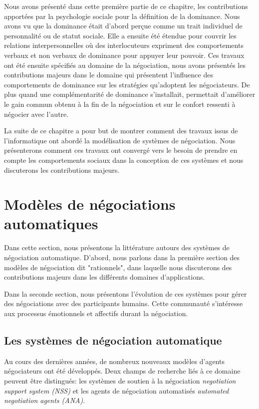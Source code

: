 	
	Nous avons présenté dans cette première partie de ce chapitre, les contributions apportées par la psychologie sociale pour la définition de la dominance. Nous avons vu que la dominance était d'abord perçue comme un trait individuel de personnalité ou de statut sociale. Elle a ensuite été étendue pour couvrir les relations interpersonnelles où des interlocuteurs expriment des comportements verbaux et non verbaux de dominance pour appuyer leur pouvoir. 
	Ces travaux ont été ensuite spécifiés au domaine de la négociation, nous avons présentés les contributions majeurs dans le domaine qui présentent l'influence des comportements de dominance sur les stratégies qu'adoptent les négociateurs. De plus quand une complémentarité de dominance s'installait, permettait d'améliorer le gain commun obtenu à la fin de la négociation et sur le confort ressenti à négocier avec l'autre.
	
	
	La suite de ce chapitre a pour but de montrer comment des travaux issus de l'informatique ont abordé la modélisation de systèmes de négociation. Nous présenterons comment ces travaux ont convergé vers le besoin de prendre en compte les comportements sociaux dans la conception de ces systèmes et nous discuterons les contributions majeurs.  
	
	
	


	\section{Modèles de négociations automatiques}
		Dans cette section, nous présentons la littérature autours des systèmes de négociation automatique. D'abord, nous parlons dans la première section des modèles de négociation dit "rationnels", dans laquelle nous discuterons des contributions majeurs dans les différents domaines d'applications. 
		
		Dans la seconde section, nous présentons l'évolution de ces systèmes pour gérer des négociations avec des participants humains. Cette communauté s'intéresse aux processus émotionnels et affectifs durant la négociation. 
	
		\subsection{Les systèmes de négociation automatique}	
		Au cours des dernières années, de nombreux nouveaux modèles d'agents négociateurs ont été développés. Deux champs de recherche liés à ce domaine peuvent être distingués: les systèmes de soutien à la négociation \emph{ negotiation support system (NSS)} et les agents de négociation automatisés \emph{automated negotiation agents (ANA)}.
	
